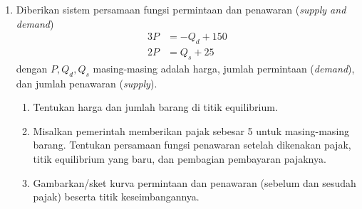 \documentclass[10pt,openany,a4paper]{article}
\theoremstyle{definition}
\theoremstyle{definition}
\theoremstyle{plain}
\begin{document}
\begin{enumerate}
    \item Diberikan sistem persamaan fungsi permintaan dan penawaran (\textit{supply and demand})
    \begin{align*}
        3P &= -Q_d+150\\
        2P &= Q_s+25
    \end{align*}
    dengan $P,Q_d,Q_s$ masing-masing adalah harga, jumlah permintaan (\textit{demand}), dan jumlah penawaran (\textit{supply}).
    \begin{enumerate}
        \item Tentukan harga dan jumlah barang di titik equilibrium.
        \item Misalkan pemerintah memberikan pajak sebesar 5 untuk masing-masing barang. Tentukan persamaan fungsi penawaran setelah dikenakan pajak, titik equilibrium yang baru, dan pembagian pembayaran pajaknya.
        \item Gambarkan/sket kurva permintaan dan penawaran (sebelum dan sesudah pajak) beserta titik keseimbangannya.
    \end{enumerate}
\end{enumerate}

\newpage
\end{document}
